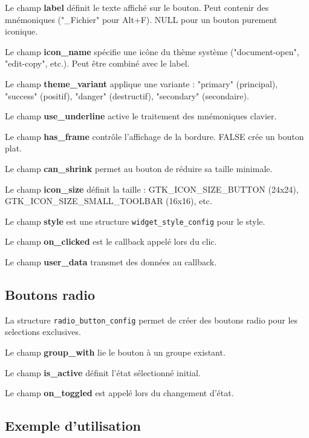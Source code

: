 \bigskip

Le champ \textbf{label} définit le texte affiché sur le bouton. Peut contenir des mnémoniques ("\_Fichier" pour Alt+F). NULL pour un bouton purement iconique.

Le champ \textbf{icon\_name} spécifie une icône du thème système ("document-open", "edit-copy", etc.). Peut être combiné avec le label.

Le champ \textbf{theme\_variant} applique une variante : "primary" (principal), "success" (positif), "danger" (destructif), "secondary" (secondaire).

Le champ \textbf{use\_underline} active le traitement des mnémoniques clavier.

Le champ \textbf{has\_frame} contrôle l'affichage de la bordure. FALSE crée un bouton plat.

Le champ \textbf{can\_shrink} permet au bouton de réduire sa taille minimale.

Le champ \textbf{icon\_size} définit la taille : GTK\_ICON\_SIZE\_BUTTON (24x24), GTK\_ICON\_SIZE\_SMALL\_TOOLBAR (16x16), etc.

Le champ \textbf{style} est une structure \texttt{widget\_style\_config} pour le style.

Le champ \textbf{on\_clicked} est le callback appelé lors du clic.

Le champ \textbf{user\_data} transmet des données au callback.

\subsection{Boutons radio}

La structure \texttt{radio\_button\_config} permet de créer des boutons radio pour les selections exclusives.

Le champ \textbf{group\_with} lie le bouton à un groupe existant.

Le champ \textbf{is\_active} définit l'état sélectionné initial.

Le champ \textbf{on\_toggled} est appelé lors du changement d'état.

\newpage

\subsection{Exemple d'utilisation}

